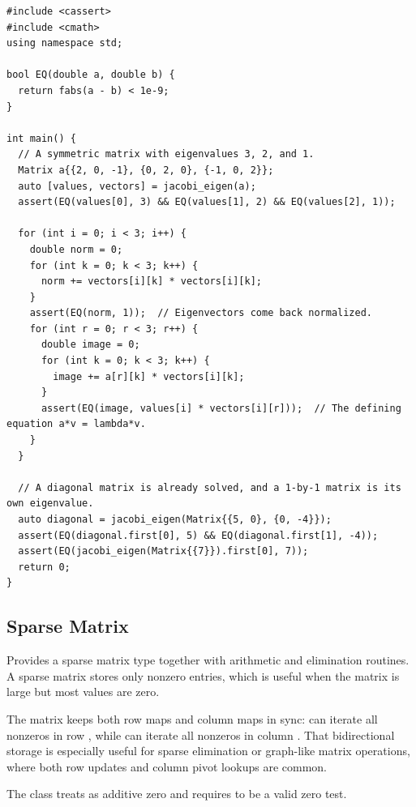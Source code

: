\begin{lstlisting}[style=cpp]
#include <cassert>
#include <cmath>
using namespace std;

bool EQ(double a, double b) {
  return fabs(a - b) < 1e-9;
}

int main() {
  // A symmetric matrix with eigenvalues 3, 2, and 1.
  Matrix a{{2, 0, -1}, {0, 2, 0}, {-1, 0, 2}};
  auto [values, vectors] = jacobi_eigen(a);
  assert(EQ(values[0], 3) && EQ(values[1], 2) && EQ(values[2], 1));

  for (int i = 0; i < 3; i++) {
    double norm = 0;
    for (int k = 0; k < 3; k++) {
      norm += vectors[i][k] * vectors[i][k];
    }
    assert(EQ(norm, 1));  // Eigenvectors come back normalized.
    for (int r = 0; r < 3; r++) {
      double image = 0;
      for (int k = 0; k < 3; k++) {
        image += a[r][k] * vectors[i][k];
      }
      assert(EQ(image, values[i] * vectors[i][r]));  // The defining equation a*v = lambda*v.
    }
  }

  // A diagonal matrix is already solved, and a 1-by-1 matrix is its own eigenvalue.
  auto diagonal = jacobi_eigen(Matrix{{5, 0}, {0, -4}});
  assert(EQ(diagonal.first[0], 5) && EQ(diagonal.first[1], -4));
  assert(EQ(jacobi_eigen(Matrix{{7}}).first[0], 7));
  return 0;
}
\end{lstlisting}
\subsection{Sparse Matrix}
\label{sec:6.5.8}
Provides a sparse matrix type together with arithmetic and elimination routines. A sparse matrix stores only nonzero entries, which is useful when the matrix is large but most values are zero.

The matrix keeps both row maps and column maps in sync:  can iterate all nonzeros in row , while  can iterate all nonzeros in column . That bidirectional storage is especially useful for sparse elimination or graph-like matrix operations, where both row updates and column pivot lookups are common.

The class treats  as additive zero and requires  to be a valid zero test.

